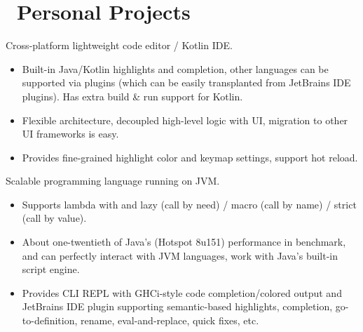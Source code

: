 \documentclass{style/resume2}
\begin{document}
\section{\faGithubAlt\ Personal Projects}
Cross-platform lightweight code editor / Kotlin IDE.
\begin{itemize}
  \item Built-in Java/Kotlin highlights and completion, other languages can be supported via plugins (which can be easily transplanted from JetBrains IDE plugins). Has extra build \& run support for Kotlin.
  \item Flexible architecture, decoupled high-level logic with UI, migration to other UI frameworks is easy.
  \item Provides fine-grained highlight color and keymap settings, support hot reload.
\end{itemize}

Scalable programming language running on JVM.
\begin{itemize}
  \item Supports lambda with and lazy (call by need) / macro (call by name) / strict (call by value).
  \item About one-twentieth of Java's (Hotspot 8u151) performance in benchmark, and can perfectly interact with JVM languages, work with Java's built-in script engine.
  \item Provides CLI REPL with GHCi-style code completion/colored output and JetBrains IDE plugin supporting semantic-based highlights, completion, go-to-definition, rename, eval-and-replace, quick fixes, etc.
\end{itemize}
\end{document}
